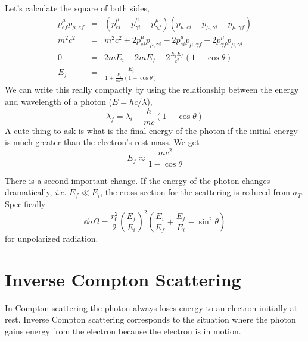 Let's calculate the square of both sides,
\begin{eqnarray}
p^\mu_{ef} 
p_{\mu,ef} &=&
( p^\mu_{ei} + p^\mu_{\gamma i} -  p^\mu_{\gamma f} ) 
( p_{\mu,ei} + p_{\mu,\gamma i} -  p_{\mu,\gamma f} ) \\
m^2 c^2 &=& m^2 c^2 + 2 p^\mu_{ei} p_{\mu,\gamma i} - 2p^\mu_{ei}
p_{\mu,\gamma f} - 2 p^\mu_{\gamma f} p_{\mu,\gamma i}  \\
0 &=& 2 m E_i - 2 m E_f - 2 \frac{E_i E_f}{c^2} \left ( 1 - \cos\theta
\right ) \\
E_f &=& \frac{E_i}{1+ \frac{E_i}{mc^2} \left ( 1 - \cos\theta
\right )}
\label{eq:401}
\end{eqnarray}
We can write this really compactly by using the relationship between
the energy and wavelength of a photon ($E=hc/\lambda$),
\begin{equation}
\lambda_f = \lambda_i + \frac{h}{mc} \left (1 - \cos \theta \right )
\label{eq:402}
\end{equation}
A cute thing to ask is what is the final energy of the photon if the 
initial energy is much greater than the electron's rest-mass.  We get
\begin{equation}
E_f \approx \frac{mc^2}{1-\cos\theta}
\label{eq:403}
\end{equation}

There is a second important change.  If the energy of the photon
changes dramatically, {\em i.e.} $E_f \ll E_i$, the cross section for
the scattering is reduced from $\sigma_T$. Specifically
\begin{equation}
\dd{\sigma}{\Omega} = \frac{r_0^2}{2} \left ( \frac{E_f}{E_i}
\right )^2 \left ( \frac{E_i}{E_f} + \frac{E_f}{E_i} - \sin^2 \theta
\right )
\label{eq:404}
\end{equation}
for unpolarized radiation. 

\section{Inverse Compton Scattering}
\label{sec:inverse-compt-scatt}

In Compton scattering the photon always loses energy to an electron
initially at rest.   Inverse Compton scattering corresponds to the
situation where the photon gains energy from the electron because the
electron is in motion.

